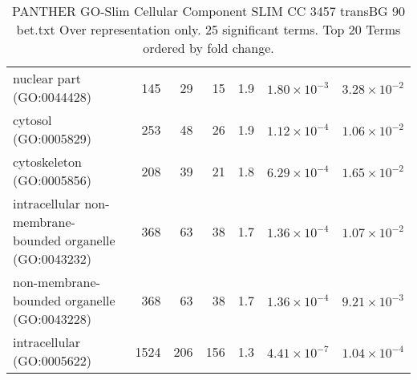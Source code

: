 \begin{table}[ht]
\begin{adjustbox}{width=\textwidth}
\begin{tabular}{lrrrrrr}
  nuclear part (GO:0044428) & 145 & 29 & 15 & 1.9 & $1.80 \times 10^{-3}$ & $3.28 \times 10^{-2}$ \\ 
  cytosol (GO:0005829) & 253 & 48 & 26 & 1.9 & $1.12 \times 10^{-4}$ & $1.06 \times 10^{-2}$ \\ 
  cytoskeleton (GO:0005856) & 208 & 39 & 21 & 1.8 & $6.29 \times 10^{-4}$ & $1.65 \times 10^{-2}$ \\ 
  intracellular non-membrane-bounded organelle (GO:0043232) & 368 & 63 & 38 & 1.7 & $1.36 \times 10^{-4}$ & $1.07 \times 10^{-2}$ \\ 
  non-membrane-bounded organelle (GO:0043228) & 368 & 63 & 38 & 1.7 & $1.36 \times 10^{-4}$ & $9.21 \times 10^{-3}$ \\ 
  intracellular (GO:0005622) & 1524 & 206 & 156 & 1.3 & $4.41 \times 10^{-7}$ & $1.04 \times 10^{-4}$ \\ 
   \hline
\end{tabular}
\end{adjustbox}
\caption{PANTHER GO-Slim Cellular Component SLIM CC 3457 transBG 90 bet.txt Over representation only. 25 significant terms. Top 20 Terms ordered by fold change. } 
\label{tab:PANTHER GO-Slim Cellular Component SLIM CC 3457 transBG 90 bet.txt Over representation only. 25 significant terms. Top 20 Terms ordered by fold change. }
\end{table}


